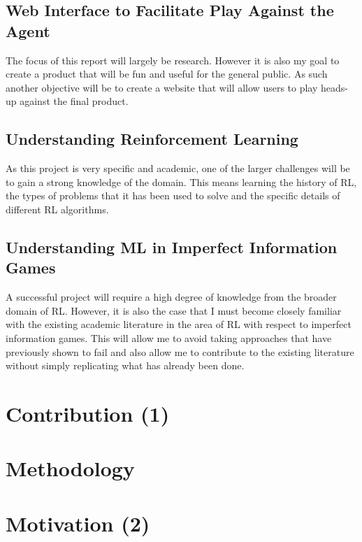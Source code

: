 \subsection{Web Interface to Facilitate Play Against the Agent}\label{subsec:webInterface}
The focus of this report will largely be research.
However it is also my goal to create a product that will be fun and useful for the general public.
As such another objective will be to create a website that will allow users to play heads-up against the final product.

\subsection{Understanding Reinforcement Learning}\label{subsec:understandingRL}
As this project is very specific and academic, one of the larger challenges will be to gain a strong knowledge
of the domain.
This means learning the history of RL, the types of problems that it has been used to solve and the specific details of
different RL algorithms.

\subsection{Understanding ML in Imperfect Information Games}\label{subsec:aiInImperfectinfo}
A successful project will require a high degree of knowledge from the broader domain of RL. However, it is also the case
that I must become closely familiar with the existing academic literature in the area of RL with respect to imperfect
information games.
This will allow me to avoid taking approaches that have previously shown to fail and also allow me to contribute to
the existing literature without simply replicating what has already been done.


\section{Contribution (1)}\label{sec:contribution}

\section{Methodology}\label{sec:methodology}

\section{Motivation (2)}\label{sec:Motivation}